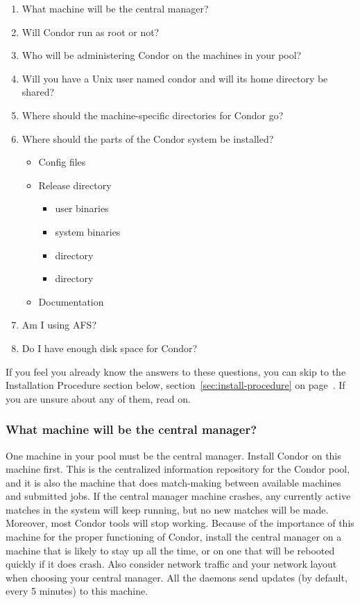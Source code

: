 \begin{enumerate}
\item What machine will be the central manager?
\item Will Condor run as root or not?
\item Who will be administering Condor on the machines in your pool?
\item Will you have a Unix user named condor and will its home directory be
   shared? 
\item Where should the machine-specific directories for Condor go?
\item Where should the parts of the Condor system be installed? 
	\begin{itemize}
	\item Config files
	\item Release directory
		\begin{itemize}
		\item user binaries
		\item system binaries 
		\item {} directory
	  	\item {} directory
		\end{itemize}
	\item Documentation
	\end{itemize}
\item Am I using AFS?
\item Do I have enough disk space for Condor?
\end{enumerate}

If you feel you already know the answers to these questions, you can
skip to the Installation Procedure section below,
section~\ref{sec:install-procedure} on
page~\pageref{sec:install-procedure}.
If you are unsure about any of them, read on.

\subsubsection{What machine will be the central manager?}

One machine in your pool must be the central manager.
Install Condor on this machine first.
This is the centralized information repository for the Condor pool,
and it is also the
machine that does match-making between available machines and
submitted jobs.
If the central manager machine crashes, any currently active
matches in the system will keep running, but no new matches will be
made.  Moreover, most Condor tools will stop working.  Because of the
importance of this machine for the proper functioning of Condor,
install the central manager on a machine that is likely to stay up all the
time, or on one that will be rebooted quickly if it does crash.
Also consider
network traffic and your network layout when choosing your central
manager.
All the daemons send updates (by default, every 5 minutes) to this machine.

